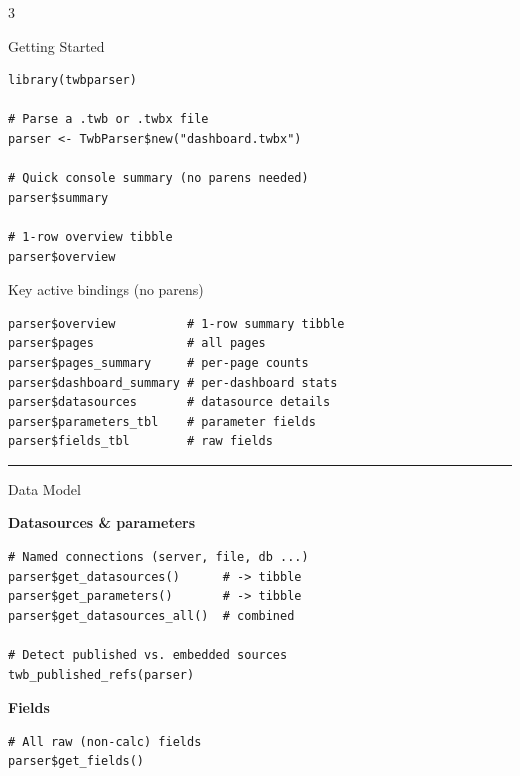\documentclass[10pt,landscape]{article}
\newcommand{\sep}{\vspace{1pt}\hrule\vspace{2pt}}
\begin{document}
\begin{multicols}{3}


\begin{secbox}[twbBlue]{Getting Started}
\end{secbox}

\begin{lstlisting}
library(twbparser)

# Parse a .twb or .twbx file
parser <- TwbParser$new("dashboard.twbx")

# Quick console summary (no parens needed)
parser$summary

# 1-row overview tibble
parser$overview
\end{lstlisting}

\begin{subbox}[twbLight]{Key active bindings (no parens)}
\begin{lstlisting}
parser$overview          # 1-row summary tibble
parser$pages             # all pages
parser$pages_summary     # per-page counts
parser$dashboard_summary # per-dashboard stats
parser$datasources       # datasource details
parser$parameters_tbl    # parameter fields
parser$fields_tbl        # raw fields
\end{lstlisting}
\end{subbox}

\sep

\begin{secbox}[twbMid]{Data Model}
\end{secbox}

\textbf{Datasources \& parameters}

\begin{lstlisting}
# Named connections (server, file, db ...)
parser$get_datasources()      # -> tibble
parser$get_parameters()       # -> tibble
parser$get_datasources_all()  # combined

# Detect published vs. embedded sources
twb_published_refs(parser)
\end{lstlisting}

\textbf{Fields}

\begin{lstlisting}
# All raw (non-calc) fields
parser$get_fields()


\end{lstlisting}
\end{multicols}
\end{document}
